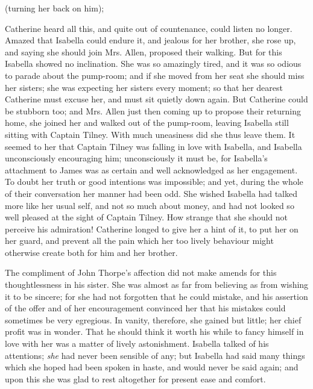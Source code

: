 

 (turning her back on him); 


Catherine heard all this, and quite out of countenance, could listen no longer. Amazed that Isabella could endure it, and jealous for her brother, she rose up, and saying she should join Mrs. Allen, proposed their walking. But for this Isabella showed no inclination. She was so amazingly tired, and it was so odious to parade about the pump-room; and if she moved from her seat she should miss her sisters; she was expecting her sisters every moment; so that her dearest Catherine must excuse her, and must sit quietly down again. But Catherine could be stubborn too; and Mrs. Allen just then coming up to propose their returning home, she joined her and walked out of the pump-room, leaving Isabella still sitting with Captain Tilney. With much uneasiness did she thus leave them. It seemed to her that Captain Tilney was falling in love with Isabella, and Isabella unconsciously encouraging him; unconsciously it must be, for Isabella's attachment to James was as certain and well acknowledged as her engagement. To doubt her truth or good intentions was impossible; and yet, during the whole of their conversation her manner had been odd. She wished Isabella had talked more like her usual self, and not so much about money, and had not looked so well pleased at the sight of Captain Tilney. How strange that she should not perceive his admiration! Catherine longed to give her a hint of it, to put her on her guard, and prevent all the pain which her too lively behaviour might otherwise create both for him and her brother.

The compliment of John Thorpe's affection did not make amends for this thoughtlessness in his sister. She was almost as far from believing as from wishing it to be sincere; for she had not forgotten that he could mistake, and his assertion of the offer and of her encouragement convinced her that his mistakes could sometimes be very egregious. In vanity, therefore, she gained but little; her chief profit was in wonder. That he should think it worth his while to fancy himself in love with her was a matter of lively astonishment. Isabella talked of his attentions; {\em she} had never been sensible of any; but Isabella had said many things which she hoped had been spoken in haste, and would never be said again; and upon this she was glad to rest altogether for present ease and comfort.

